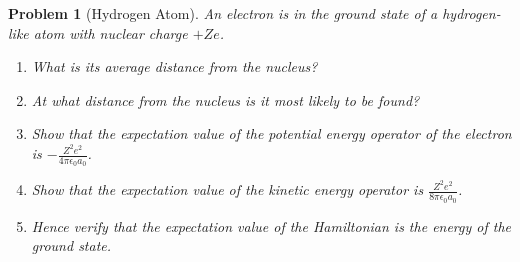 \documentclass[a4paper]{article}
\theoremstyle{new}
\newtheorem{qns}{Problem}[section]
\begin{document}
\newpage
\begin{qns}[Hydrogen Atom]
An electron is in the ground state of a hydrogen-like atom with nuclear charge $+Ze$.
\begin{enumerate}[label=(\alph*)]
\item What is its average distance from the nucleus?
\item At what distance from the nucleus is it most likely to be found?
\item Show that the expectation value of the potential energy operator of the electron is $-\frac{Z^2e^2}{4\pi\epsilon_0a_0}$.
\item Show that the expectation value of the kinetic energy operator is $\frac{Z^2e^2}{8\pi\epsilon_0a_0}$.
\item Hence verify that the expectation value of the Hamiltonian is the energy of the ground state. 
\end{enumerate}
\end{qns}
\end{document}
